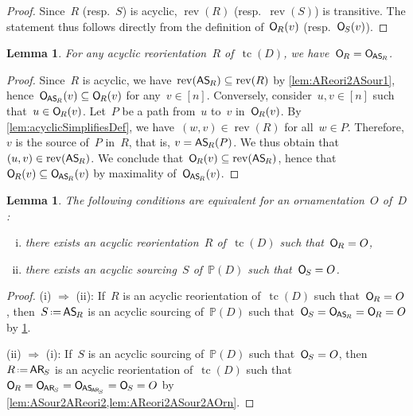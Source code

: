 \documentclass{amsart}
\newtheorem{lemma}[theorem]{Lemma}
\theoremstyle{definition}
\newcommand{\eqdef}{\mbox{\,\raisebox{0.2ex}{\scriptsize\ensuremath{\mathrm:}}\ensuremath{=}\,}} %
\DeclareMathOperator{\tc}{tc} %
\newcommand{\mymap}[2]{\mathsf{#1}_{\hspace{-.7pt}#2}}
\newcommand{\orn}[1]{\mymap{O}{#1}}  %
\newcommand{\areori}[1]{\mymap{AR}{#1}}  %
\DeclareMathOperator{\rev}{rev} %
\newcommand{\asour}[1]{\mymap{AS}{#1}}  %
\newcommand{\PP}{\mathbb P} %
\begin{document}
\begin{proof}
Since~$R$ (resp.~$S$) is acyclic, $\rev(R)$ (resp.~$\rev(S)$) is transitive.
The statement thus follows directly from the definition of~$\orn{R}(v)$ (resp.~$\orn{S}(v)$).
\end{proof}

\begin{lemma}
\label{lem:AReori2ASour2AOrn}
For any acyclic reorientation~$R$ of~$\tc(D)$, we have~$\orn{R} = \orn{\asour{R}}$.
\end{lemma}

\begin{proof}
Since~$R$ is acyclic, we have~$\rev(\asour{R}) \subseteq \rev(R)$ by \cref{lem:AReori2ASour1}, hence~$\orn{\asour{R}}(v) \subseteq \orn{R}(v)$ for any~$v \in [n]$.
Conversely, consider~$u,v \in [n]$ such that~$u \in \orn{R}(v)$.
Let~$P$ be a path from~$u$ to~$v$ in~$\orn{R}(v)$.
By \cref{lem:acyclicSimplifiesDef}, we have~$(w,v) \in \rev(R)$ for all~$w \in P$.
Therefore, $v$ is the source of~$P$ in~$R$, that is, $v = \asour{R}(P)$.
We thus obtain that~$(u,v) \in \rev(\asour{R})$.
We conclude that~$\orn{R}(v) \subseteq \rev(\asour{R})$, hence that~$\orn{R}(v) \subseteq \orn{\asour{R}}(v)$ by maximality of~$\orn{\asour{R}}(v)$.
\end{proof}

\begin{lemma}
\label{lem:AOrn2}
The following conditions are equivalent for an ornamentation~$O$ of~$D$:
\begin{enumerate}[(i)]
\item there exists an acyclic reorientation~$R$ of~$\tc(D)$ such that~$\orn{R} = O$,
\item there exists an acyclic sourcing~$S$ of~$\PP(D)$ such that~$\orn{S} = O$.
\end{enumerate}
\end{lemma}

\begin{proof}
(i) $\Rightarrow$ (ii): If~$R$ is an acyclic reorientation of~$\tc(D)$ such that~$\orn{R} = O$, then~$S \eqdef \asour{R}$ is an acyclic sourcing of~$\PP(D)$ such that~$\orn{S} = \orn{\asour{R}} = \orn{R} = O$ by \cref{lem:AReori2ASour2AOrn}.

\medskip\noindent
(ii) $\Rightarrow$ (i): If~$S$ is an acyclic sourcing of~$\PP(D)$ such that~$\orn{S} = O$, then~$R \eqdef \areori{S}$ is an acyclic reorientation of~$\tc(D)$ such that~$\orn{R} = \orn{\areori{S}} = \orn{\asour{\areori{S}}} = \orn{S} = O$ by \cref{lem:ASour2AReori2,lem:AReori2ASour2AOrn}.
\end{proof}
\end{document}
